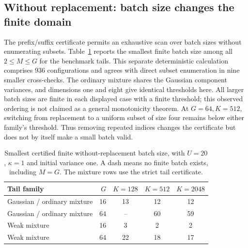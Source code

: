 \subsection{Without replacement: batch size changes the finite domain}\label{sec:without-replacement-results}
The prefix/suffix certificate permits an exhaustive scan over batch sizes without enumerating subsets. Table~\ref{tab:batch-thresholds} reports the smallest finite batch size among all $2\le M\le G$ for the benchmark tails. This separate deterministic calculation comprises 936 configurations and agrees with direct subset enumeration in nine smaller cross-checks. The ordinary mixture shares the Gaussian component variances, and dimensions one and eight give identical thresholds here. All larger batch sizes are finite in each displayed case with a finite threshold; this observed ordering is not claimed as a general monotonicity theorem. At $G=64,K=512$, switching from replacement to a uniform subset of size four remains below either family's threshold. Thus removing repeated indices changes the certificate but does not by itself make a small batch valid.

\begin{table}[t]
 \centering
 \caption{Smallest certified finite without-replacement batch size, with $U=20$, $\kappa=1$ and initial variance one. A dash means no finite batch exists, including $M=G$. The mixture rows use the strict tail certificate.}
 \label{tab:batch-thresholds}
 \begin{tabular}{lrccc}
 \toprule
 Tail family & $G$ & $K=128$ & $K=512$ & $K=2048$\\
 \midrule
 Gaussian / ordinary mixture & 16 & 13 & 12 & 12\\
 Gaussian / ordinary mixture & 64 & -- & 60 & 59\\
 Weak mixture & 16 & 3 & 2 & 2\\
 Weak mixture & 64 & 22 & 18 & 17\\
 \bottomrule
 \end{tabular}
\end{table}
